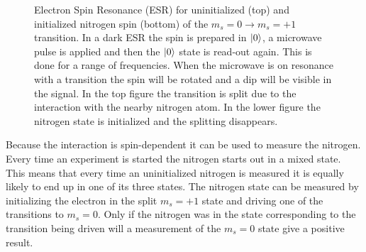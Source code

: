     \begin{figure}[htbp]
    \centering
        \caption{ Electron Spin Resonance (ESR) for uninitialized (top) and initialized nitrogen spin (bottom) of the $m_s =0 \rightarrow m_s = +1$ transition. In a dark ESR the spin is prepared in ${\left\vert{0}\right\rangle}$, a microwave pulse is applied and then the ${\left\vert{0}\right\rangle}$ state is read-out again. This is done for a range of frequencies. When the microwave is on resonance with a transition the spin will be rotated and a dip will be visible in the signal. In the top figure the transition is split due to the interaction with the nearby nitrogen atom. In the lower figure the nitrogen state is initialized and the splitting disappears.}
        \label{fig:HF_split_levels}
    \end{figure}

Because the interaction is spin-dependent it can be used to measure the nitrogen.
Every time an experiment is started the nitrogen starts out in a mixed state.
This means that every time an uninitialized nitrogen is measured it is equally likely to end up in one of its three states.
The nitrogen state can be measured by initializing the electron in the split $m_s = +1$ state and driving one of the transitions to $m_s=0$.
Only if the nitrogen was in the state corresponding to the transition being driven will a measurement of the $m_s =0$ state give a positive result.

